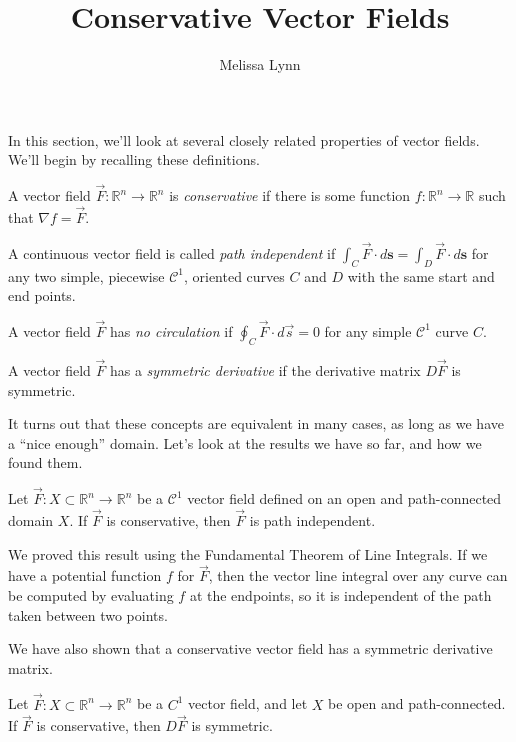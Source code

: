 \documentclass{ximera}
\title{Conservative Vector Fields}
\author{Melissa Lynn}
\begin{document}
  
\begin{abstract}  
\end{abstract}  
\maketitle  

In this section, we'll look at several closely related properties of vector fields. We'll begin by recalling these definitions.

\begin{definition}
A vector field $\vec{F}:\mathbb{R}^n\rightarrow\mathbb{R}^n$ is \emph{conservative} if there is some function $f:\mathbb{R}^n\rightarrow\mathbb{R}$ such that $\nabla f = \vec{F}$.

A continuous vector field is called \emph{path independent} if $\int_C \vec{F}\cdot d\textbf{s}=\int_D \vec{F}\cdot d\textbf{s}$ for any two simple, piecewise $\mathcal{C}^1$, oriented curves $C$ and $D$ with the same start and end points.

A vector field $\vec{F}$ has \emph{no circulation} if $\oint_C \vec{F}\cdot d\vec{s} = 0$ for any simple $\mathcal{C}^1$ curve $C$.

A vector field $\vec{F}$ has a \emph{symmetric derivative} if the derivative matrix $D\vec{F}$ is symmetric.
\end{definition}

It turns out that these concepts are equivalent in many cases, as long as we have a ``nice enough'' domain. Let's look at the results we have so far, and how we found them.

\begin{proposition}
Let $\vec{F}:X\subset\mathbb{R}^n\rightarrow\mathbb{R}^n$ be a $\mathcal{C}^1$ vector field defined on an open and path-connected domain $X$. If $\vec{F}$ is conservative, then $\vec{F}$ is path independent.
\end{proposition}

We proved this result using the Fundamental Theorem of Line Integrals. If we have a potential function $f$ for $\vec{F}$, then the vector line integral over any curve can be computed by evaluating $f$ at the endpoints, so it is independent of the path taken between two points.

We have also shown that a conservative vector field has a symmetric derivative matrix.

\begin{proposition}
Let $\vec{F}:X\subset\mathbb{R}^n\rightarrow \mathbb{R}^n$ be a $C^1$ vector field, and let $X$ be open and path-connected. If $\vec{F}$ is conservative, then $D\vec{F}$ is symmetric.
\end{proposition}
\end{document}
